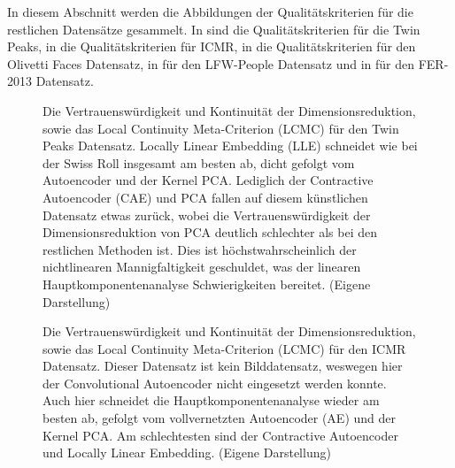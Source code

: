 In diesem Abschnitt werden die Abbildungen der Qualitätskriterien für die restlichen Datensätze
gesammelt. In  sind die Qualitätskriterien für die Twin Peaks, in
 die Qualitätskriterien für ICMR, in  die
Qualitätskriterien für den Olivetti Faces Datensatz, in  für den
LFW-People Datensatz und in  für den FER-2013 Datensatz.
\begin{figure}[ht]
	\begin{center}
		
	\end{center}
	\caption[Twin Peaks Qualitätskriterien]{Die Vertrauenswürdigkeit und Kontinuität der Dimensionsreduktion, sowie das Local Continuity Meta-Criterion (LCMC) für den Twin Peaks Datensatz. Locally Linear Embedding (LLE) schneidet wie bei der Swiss Roll insgesamt am besten ab, dicht gefolgt vom Autoencoder und der Kernel PCA. Lediglich der Contractive Autoencoder (CAE) und PCA fallen auf diesem künstlichen Datensatz etwas zurück, wobei die Vertrauenswürdigkeit der Dimensionsreduktion von PCA deutlich schlechter als bei den restlichen Methoden ist. Dies ist höchstwahrscheinlich der nichtlinearen Mannigfaltigkeit geschuldet, was der linearen Hauptkomponentenanalyse Schwierigkeiten bereitet. (Eigene Darstellung)}
	\label{fig:TwinPeaksMetrics}
\end{figure}

\begin{figure}[ht]
	\begin{center}
		
	\end{center}
	\caption[ICMR Qualitätskriterien]{Die Vertrauenswürdigkeit und Kontinuität der Dimensionsreduktion, sowie das Local Continuity Meta-Criterion (LCMC) für den ICMR Datensatz. Dieser Datensatz ist kein Bilddatensatz, weswegen hier der Convolutional Autoencoder nicht eingesetzt werden konnte. Auch hier schneidet die Hauptkomponentenanalyse wieder am besten ab, gefolgt vom vollvernetzten Autoencoder (AE) und der Kernel PCA. Am schlechtesten sind der Contractive Autoencoder und Locally Linear Embedding. (Eigene Darstellung)}
	\label{fig:ICMRMetrics}
\end{figure}

